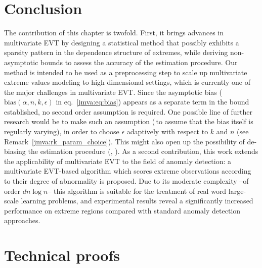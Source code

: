 \section{Conclusion}
The contribution of this chapter is twofold. First, it brings advances in multivariate EVT by designing a statistical method that possibly exhibits a sparsity pattern in the dependence structure of extremes, while deriving non-asymptotic bounds to assess the accuracy of the estimation procedure. Our method is intended to be used as a preprocessing step to scale up multivariate extreme values modeling to high dimensional settings, which is currently one of the major challenges in multivariate EVT.
Since the asymptotic bias ($\text{bias}(\alpha,n,k, \epsilon)$ in eq.~\eqref{jmva:eq:bias}) appears as a separate term  in the bound established, no second order
assumption is required. One possible line of further research would be to make  such an assumption (\ie\,to assume that the bias itself is regularly varying), in order to choose $\epsilon$ adaptively with respect to $k$ and $n$ (see Remark~\ref{jmva:rk_param_choice}). This might also open up the possibility of de-biasing the estimation procedure (\cite{Fougeres2015}, \cite{Beirlant2015}). 
As a second contribution, this work extends the applicability of multivariate  EVT to the field of anomaly detection: a multivariate EVT-based algorithm which scores extreme observations according to their degree of abnormality is proposed. Due to  its  moderate complexity  --of order $d n \log n$--  this algorithm is suitable for the treatment of real word large-scale learning problems, and experimental results reveal a significantly increased performance on extreme regions compared with standard anomaly detection approaches.

 
\section{Technical proofs}
\label{jmva:appendix_proof}
